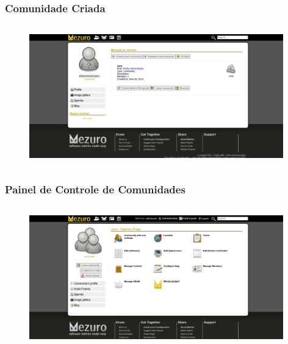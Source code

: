 \documentclass{beamer}
\begin{document}
    \begin{frame}
      \frametitle{Comunidade Criada}
      \framesubtitle{}
    
      \begin{figure}
        \begin{center}
          \includegraphics[width=11cm, height=6cm]{images/03-community-created.png}
          \label{fig:}
        \end{center}
      \end{figure}
    \end{frame}
    
    \begin{frame}
      \frametitle{Painel de Controle de Comunidades}
      \framesubtitle{}
    
      \begin{figure}
        \begin{center}
          \includegraphics[width=11cm, height=6cm]{images/04-community-control-panel.png}
          \label{fig:community-control-panel}
        \end{center}
      \end{figure}
    \end{frame}
    
\end{document}

